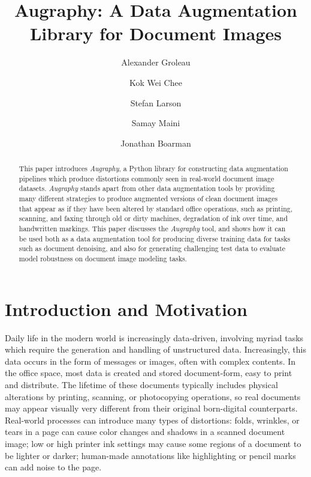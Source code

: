 \documentclass[runningheads]{llncs}
\begin{document}
\title{Augraphy: A Data Augmentation Library for Document Images}
\author{Alexander Groleau \and
Kok Wei Chee \and
Stefan Larson \and
Samay Maini \and
Jonathan Boarman}



\maketitle

\begin{abstract}
This paper introduces \emph{Augraphy}, a Python library for constructing data augmentation pipelines which produce distortions commonly seen in real-world document image datasets.
\emph{Augraphy} stands apart from other data augmentation tools by providing many different strategies to produce augmented versions of clean document images that appear as if they have been altered by standard office operations, such as printing, scanning, and faxing through old or dirty machines, degradation of ink over time, and handwritten markings.
This paper discusses the \emph{Augraphy} tool, and shows how it can be used both as a data augmentation tool for producing diverse training data for tasks such as document denoising, and also for generating challenging test data to evaluate model robustness on document image modeling tasks.

\end{abstract}

\section{Introduction and Motivation}
Daily life in the modern world is increasingly data-driven, involving myriad tasks which require the generation and handling of unstructured data.
Increasingly, this data occurs in the form of messages or images, often with complex contents.
In the office space, most data is created and stored document-form, easy to print and distribute.
The lifetime of these documents typically includes physical alterations by printing, scanning, or photocopying operations, so real documents may appear visually very different from their original born-digital counterparts.
Real-world processes can introduce many types of distortions: folds, wrinkles, or tears in a page can cause color changes and shadows in a scanned document image; low or high printer ink settings may cause some regions of a document to be lighter or darker; human-made annotations like highlighting or pencil marks can add noise to the page.
\end{document}
